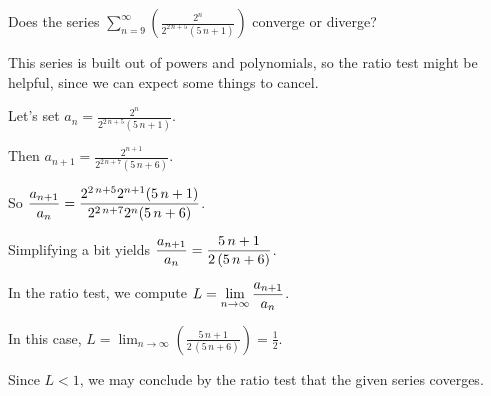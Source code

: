 \documentclass{ximera}
\begin{document}
\begin{question}
  Does the series \(\displaystyle\sum_{n=9}^\infty \left( \displaystyle\frac{2^{n} }{2^{2 \, n + 5} {\left(5 \, n + 1\right)} } \right)\) converge or diverge?
  
  \begin{solution}
    \begin{hint}
      This series is built out of powers and polynomials, so the ratio test might be helpful, since we can expect some things to cancel.
    \end{hint}
    \begin{hint}
      Let's set \(a_n = \displaystyle\frac{2^{n} }{2^{2 \, n + 5} {\left(5 \, n + 1\right)} }\).
    \end{hint}
    \begin{hint}
      Then \(a_{n+1} = \displaystyle\frac{2^{n + 1} }{2^{2 \, n + 7} {\left(5 \, n + 6\right)} }\).
    \end{hint}
    \begin{hint}
      So \(\displaystyle\displaystyle\frac{a_{n+1} }{a_n} = \displaystyle\frac{2^{2 \, n + 5} 2^{n + 1} {\left(5 \, n + 1\right)} }{2^{2 \, n + 7} 2^{n} {\left(5 \, n + 6\right)} }\).
    \end{hint}
    \begin{hint}
      Simplifying a bit yields \(\displaystyle\displaystyle\frac{a_{n+1} }{a_n} = \displaystyle\frac{5 \, n + 1}{2 \, {\left(5 \, n + 6\right)} }\).
    \end{hint}
    \begin{hint}
      In the ratio test, we compute \(L = \displaystyle\lim_{n \to \infty} \displaystyle\displaystyle\frac{a_{n+1} }{a_n}\).
    \end{hint}
    \begin{hint}
      In this case, \(L = \displaystyle\lim_{n \to \infty} \left( \displaystyle\frac{5 \, n + 1}{2 \, {\left(5 \, n + 6\right)} } \right) = \displaystyle\frac{1}{2}\).
    \end{hint}
    \begin{hint}
      Since \(L < 1\), we may conclude by the ratio test that the given series coverges.
    \end{hint}


    \begin{multiple-choice}
    \end{multiple-choice}

  \end{solution}
\end{question}
            
\end{document}
